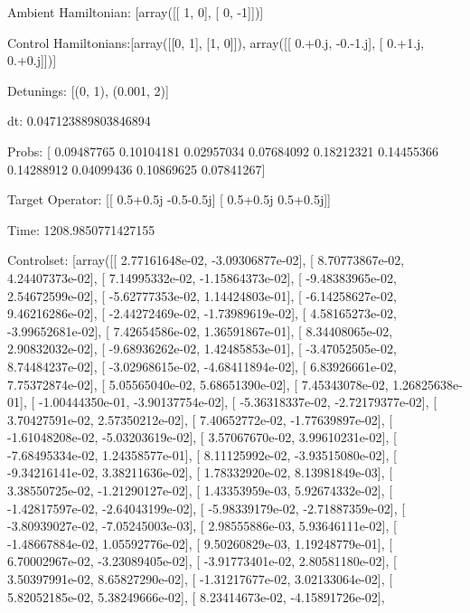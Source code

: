 \documentclass{article}
\begin{document}
    

\newpage

Ambient Hamiltonian: [array([[ 1,  0],
       [ 0, -1]])]

Control Hamiltonians:[array([[0, 1],
       [1, 0]]), array([[ 0.+0.j, -0.-1.j],
       [ 0.+1.j,  0.+0.j]])]

Detunings: [(0, 1), (0.001, 2)]

 dt: 0.047123889803846894

Probs: [ 0.09487765  0.10104181  0.02957034  0.07684092  0.18212321  0.14455366
  0.14288912  0.04099436  0.10869625  0.07841267]

Target Operator: [[ 0.5+0.5j -0.5-0.5j]
 [ 0.5+0.5j  0.5+0.5j]]

Time: 1208.9850771427155

Controlset: [array([[  2.77161648e-02,  -3.09306877e-02],
       [  8.70773867e-02,   4.24407373e-02],
       [  7.14995332e-02,  -1.15864373e-02],
       [ -9.48383965e-02,   2.54672599e-02],
       [ -5.62777353e-02,   1.14424803e-01],
       [ -6.14258627e-02,   9.46216286e-02],
       [ -2.44272469e-02,  -1.73989619e-02],
       [  4.58165273e-02,  -3.99652681e-02],
       [  7.42654586e-02,   1.36591867e-01],
       [  8.34408065e-02,   2.90832032e-02],
       [ -9.68936262e-02,   1.42485853e-01],
       [ -3.47052505e-02,   8.74484237e-02],
       [ -3.02968615e-02,  -4.68411894e-02],
       [  6.83926661e-02,   7.75372874e-02],
       [  5.05565040e-02,   5.68651390e-02],
       [  7.45343078e-02,   1.26825638e-01],
       [ -1.00444350e-01,  -3.90137754e-02],
       [ -5.36318337e-02,  -2.72179377e-02],
       [  3.70427591e-02,   2.57350212e-02],
       [  7.40652772e-02,  -1.77639897e-02],
       [ -1.61048208e-02,  -5.03203619e-02],
       [  3.57067670e-02,   3.99610231e-02],
       [ -7.68495334e-02,   1.24358577e-01],
       [  8.11125992e-02,  -3.93515080e-02],
       [ -9.34216141e-02,   3.38211636e-02],
       [  1.78332920e-02,   8.13981849e-03],
       [  3.38550725e-02,  -1.21290127e-02],
       [  1.43353959e-03,   5.92674332e-02],
       [ -1.42817597e-02,  -2.64043199e-02],
       [ -5.98339179e-02,  -2.71887359e-02],
       [ -3.80939027e-02,  -7.05245003e-03],
       [  2.98555886e-03,   5.93646111e-02],
       [ -1.48667884e-02,   1.05592776e-02],
       [  9.50260829e-03,   1.19248779e-01],
       [  6.70002967e-02,  -3.23089405e-02],
       [ -3.91773401e-02,   2.80581180e-02],
       [  3.50397991e-02,   8.65827290e-02],
       [ -1.31217677e-02,   3.02133064e-02],
       [  5.82052185e-02,   5.38249666e-02],
       [  8.23414673e-02,  -4.15891726e-02],
\end{document}
